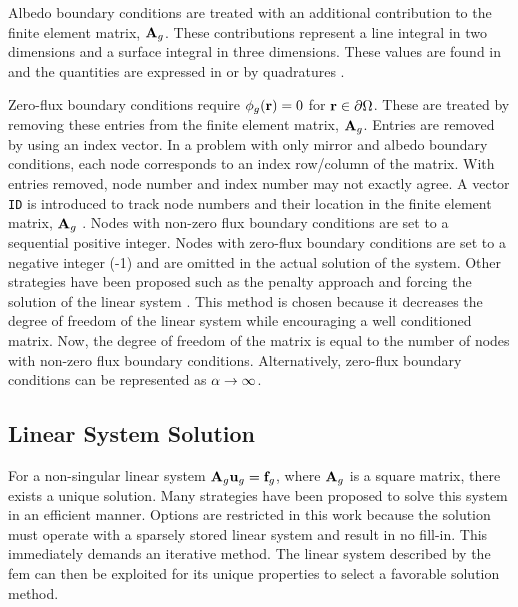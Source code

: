    Albedo boundary conditions are treated with an additional contribution to 
    the finite element matrix, $\mathbf{A}_g$. These contributions represent a line 
    integral in two dimensions and a surface integral in three dimensions. These
    values are found in  and the quantities are 
    expressed in  or by quadratures 
    .
    
    Zero-flux boundary conditions require $\phi_g(\mathbf{r}) = 0$ for $\mathbf{r} \in
    \partial \Omega$. These are treated by removing these entries from the
    finite element matrix, $\mathbf{A}_g$. Entries are removed by using an index vector.
    In a problem with only mirror and albedo boundary conditions, each node
    corresponds to an index row/column of the matrix. With entries removed, node
    number and index number may not exactly agree. A vector \texttt{ID} is
    introduced to track node numbers and their location in the finite element
    matrix, $\mathbf{A}_g$ \cite{textbookjohnson}. Nodes with non-zero flux boundary
    conditions are set to a sequential positive integer. Nodes with zero-flux
    boundary conditions are set to a negative integer (-1) and are omitted in
    the actual solution of the system. Other strategies have been proposed such
    as the penalty approach \cite{textbookhughes} and forcing the solution of
    the linear system \cite{textbookli}. This method is chosen because it
    decreases the degree of freedom of the linear system while encouraging a
    well conditioned matrix.  Now, the degree of freedom of the matrix is equal
    to the number of nodes with non-zero flux boundary conditions.
    Alternatively, zero-flux boundary conditions can be represented as $\alpha
    \rightarrow \infty$.
    
  \subsection{Linear System Solution}
    \label{sec:linear_system_solution}
    For a non-singular linear system $\mathbf{A}_g \mathbf{u}_g = \mathbf{f}_g$, where $\mathbf{A}_g$ is a 
    square matrix, there exists a unique solution. Many strategies have been 
    proposed to solve this system in an efficient manner. Options are restricted
    in this work because the solution must operate with a sparsely stored linear
    system and result in no fill-in. This immediately demands an iterative
    method. The linear system described by the \gls{fem} can then be exploited
    for its unique properties to select a favorable solution method.
    
